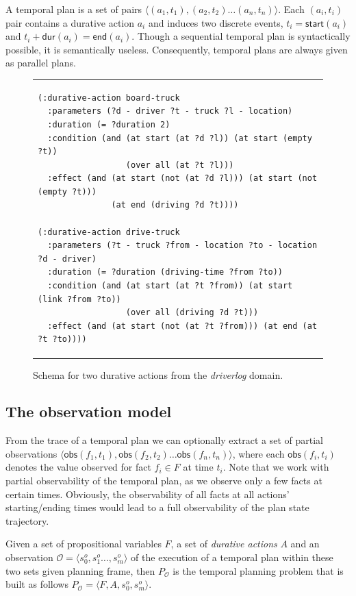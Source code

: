 \documentclass[runningheads]{llncs}
\newcommand{\tup}[1]{{\langle #1 \rangle}}
\newcommand{\dur}{\mathsf{dur}}    %
\newcommand{\obs}{\mathsf{obs}}    %
\newcommand{\start}{\mathsf{start}}%
\newcommand{\en}{\mathsf{end}}     %
\begin{document}
A temporal plan is a set of pairs $\tup{(a_1,t_1),(a_2,t_2)\ldots (a_n,t_n)}$. Each $(a_i,t_i)$ pair contains a durative action $a_i$ and induces two discrete events, $t_i=\start(a_i)$ and $t_i+\dur(a_i)=\en(a_i)$. Though a sequential temporal plan is syntactically possible, it is semantically useless. Consequently, temporal plans are always given as parallel plans.

\begin{figure}
\begin{tabular}{p{\textwidth}}
\begin{verbatim}
(:durative-action board-truck
  :parameters (?d - driver ?t - truck ?l - location)
  :duration (= ?duration 2)
  :condition (and (at start (at ?d ?l)) (at start (empty ?t))
                  (over all (at ?t ?l)))
  :effect (and (at start (not (at ?d ?l))) (at start (not (empty ?t)))
               (at end (driving ?d ?t))))

(:durative-action drive-truck
  :parameters (?t - truck ?from - location ?to - location ?d - driver)
  :duration (= ?duration (driving-time ?from ?to))
  :condition (and (at start (at ?t ?from)) (at start (link ?from ?to))
                  (over all (driving ?d ?t)))
  :effect (and (at start (not (at ?t ?from))) (at end (at ?t ?to))))
\end{verbatim}
\end{tabular}
\label{fig:exampleactions2}
\caption{\small Schema for two durative actions from the {\em driverlog} domain.}
\end{figure}


\subsection{The observation model}
\label{sec:omodel}
From the trace of a temporal plan we can optionally extract a set of partial observations $\tup{\obs(f_1,t_1),\obs(f_2,t_2)\ldots \obs(f_n,t_n)}$, where each $\obs(f_i,t_i)$ denotes the value observed for fact $f_i \in F$ at time $t_i$. Note that we work with partial observability of the temporal plan, as we observe only a few facts at certain times. Obviously, the observability of all facts at all actions' starting/ending times would lead to a full observability of the plan state trajectory.

Given a set of propositional variables $F$, a set of {\em durative actions} $A$ and an observation $\mathcal{O}=\tup{s_0^o,s_1^o \ldots , s_m^o}$ of the execution of a temporal plan within these two sets given planning frame, then $P_\mathcal{O}$ is the temporal planning problem that is built as follows $P_\mathcal{O}=\tup{F,A,s_0^o,s_m^o}$. 
\end{document}
